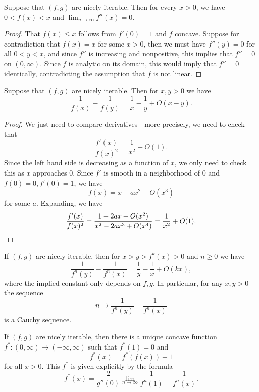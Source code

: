 \documentclass[letterpaper,11pt]{article}
\begin{document}
\begin{prop} Suppose that $(f,g)$ are nicely iterable. Then for every $x > 0$, we have $0 < f(x) < x$ and $\lim_{n\rightarrow\infty} f^n(x) = 0$.
\end{prop}
\begin{proof} That $f(x) \le x$ follows from $f'(0) = 1$ and $f$ concave. Suppose for contradiction that $f(x) = x$ for some $x > 0$, then we must have $f''(y) = 0$ for all $0 < y < x$, and since $f''$ is increasing and nonpositive, this implies that $f'' = 0$ on $(0,\infty)$. Since $f$ is analytic on its domain, this would imply that $f'' = 0$ identically, contradicting the assumption that $f$ is not linear.
\end{proof}

\begin{prop} Suppose that $(f,g)$ are nicely iterable. Then for $x,y > 0$ we have
\[
\frac{1}{f(x)} - \frac{1}{f(y)} = \frac{1}{x} - \frac{1}{y} + O(x-y).
\]
\end{prop}
\begin{proof} We just need to compare derivatives - more precisely, we need to check that
\[
\frac{f'(x)}{f(x)^2} = \frac{1}{x^2} + O(1).
\]
Since the left hand side is decreasing as a function of $x$, we only need to check this as $x$ approaches $0$. Since $f'$ is smooth in a neighborhood of $0$ and $f(0) = 0, f'(0) = 1$, we have
\[
f(x) = x - ax^2 + O(x^3)
\]
for some $a$. Expanding, we have
\[
\frac{f'(x)}{f(x)^2} = \frac{1 - 2ax + O(x^2)}{x^2 - 2ax^3 + O(x^4)} = \frac{1}{x^2} + O(1).\qedhere
\]
\end{proof}

\begin{cor} If $(f,g)$ are nicely iterable, then for $x > y > f^k(x) > 0$ and $n \ge 0$ we have
\[
\frac{1}{f^n(y)} - \frac{1}{f^n(x)} = \frac{1}{y} - \frac{1}{x} + O(kx),
\]
where the implied constant only depends on $f,g$. In particular, for any $x,y > 0$ the sequence
\[
n \mapsto \frac{1}{f^n(y)} - \frac{1}{f^n(x)}
\]
is a Cauchy sequence.
\end{cor}

\begin{prop} If $(f,g)$ are nicely iterable, then there is a unique concave function $f^*:(0,\infty) \rightarrow (-\infty,\infty)$ such that $f^*(1) = 0$ and
\[
f^*(x) = f^*(f(x)) + 1
\]
for all $x > 0$. This $f^*$ is given explicitly by the formula
\[
f^*(x) = \frac{2}{g''(0)}\lim_{n\rightarrow\infty} \frac{1}{f^{n}(1)} - \frac{1}{f^{n}(x)}.
\]
\end{prop}
\end{document}
